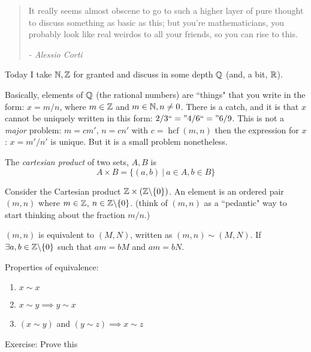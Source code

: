 \documentclass[twoside]{scrartcl}
\DeclareMathOperator{\hcf}{hcf}
\begin{document}

\begin{quote}
It really seems almost obscene to go to such a higher layer of pure thought to discuss something as basic as this; but you're mathematicians, you probably look like real weirdos to all your friends, so you can rise to this.  
\begin{flushright}
      \textit{ -  Alessio Corti}
       \end{flushright} 
\end{quote}\vspace*{15pt}


Today  I take $\mathbb{N}, \mathbb{Z}$ for granted and discuss in some depth $\mathbb{Q}$ (and, a bit, $\mathbb{R}$). 


Basically, elements of $\mathbb{Q}$ (the rational numbers) are ``things" that you write in the form: $x = m/n$, where $m \in \mathbb{Z}$ and $m \in\mathbb{N}, n \neq 0$. There is a catch, and it is that $x$ cannot be uniquely written in this form: 
$2/3 ``=" 4/6 ``=" 6/9$. This is not a \emph{major} problem: $m = cm'$, $n = cn'$ with $c = \hcf(m,n)$ then the expression for $x$: $x = m'/n'$ is unique. But it is a small problem nonetheless.\\

\begin{definition}
The \emph{cartesian product} of two sets, $A,B$ is 
\[A \times B = \{(a,b) ~|~ a \in A, b \in B\}\]	
\end{definition}

Consider the Cartesian product $\mathbb{Z} \times (\mathbb{Z} \backslash\{0\})$. An element is an ordered pair $(m,n)$ where $m \in \mathbb{Z}$, $n \in \mathbb{Z}\backslash\{0\}$. (think of $(m,n)$ as a ``pedantic" way to start thinking about the fraction $m/n$.)\\

\begin{definition}
$(m,n)$ is equivalent to $(M,N)$, written as $(m,n) \sim 	(M,N)$. If $\exists a,b \in \mathbb{Z}\backslash\{0\}$ such that $am = bM$ and $am = bN$. 
\end{definition}

Properties of equivalence: 
\begin{enumerate}
\item $x \sim x$
\item $x \sim y \implies y \sim x$
\item $(x\sim y)$ and $(y \sim z) \implies x \sim z$	
\end{enumerate}
Exercise: Prove this\\
\end{document}
